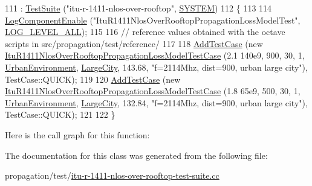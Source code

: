 \begin{DoxyCode}
111   : \hyperlink{classns3_1_1TestSuite_a904b0c40583b744d30908aeb94636d1a}{TestSuite} (\textcolor{stringliteral}{"itu-r-1411-nlos-over-rooftop"}, \hyperlink{classns3_1_1TestSuite_a1ebfcab34ec8161e085e8e3a1855eae0a90c5529a26ab3a5ffcc6e57040dbd82e}{SYSTEM})
112 \{
113 
114   \hyperlink{namespacens3_adc4ef4f00bb2f5f4edae67fc3bc27f20}{LogComponentEnable} (\textcolor{stringliteral}{"ItuR1411NlosOverRooftopPropagationLossModelTest"}, 
      \hyperlink{namespacens3_aa6464a4d69551a9cc968e17a65f39bdba022b1237a4fd1b08d034471df3c58586}{LOG\_LEVEL\_ALL});
115 
116   \textcolor{comment}{// reference values obtained with the octave scripts in src/propagation/test/reference/}
117 
118   \hyperlink{classns3_1_1TestCase_a3718088e3eefd5d6454569d2e0ddd835}{AddTestCase} (\textcolor{keyword}{new} 
      \hyperlink{classItuR1411NlosOverRooftopPropagationLossModelTestCase}{ItuR1411NlosOverRooftopPropagationLossModelTestCase} (2.1
      140e9, 900, 30, 1, \hyperlink{group__propagation_gga0e392ed771a28c92112047e63308a53aad575d1b07ccac0218783bbd0f523784c}{UrbanEnvironment}, \hyperlink{group__propagation_gga29c9a1b1a58b6a56054ff5ea4c5a574da017d6be2af0a102a6147e6519d63f54c}{LargeCity}, 143.68, \textcolor{stringliteral}{"f=2114Mhz, dist=900, urban
       large city"}), TestCase::QUICK);
119 
120   \hyperlink{classns3_1_1TestCase_a3718088e3eefd5d6454569d2e0ddd835}{AddTestCase} (\textcolor{keyword}{new} 
      \hyperlink{classItuR1411NlosOverRooftopPropagationLossModelTestCase}{ItuR1411NlosOverRooftopPropagationLossModelTestCase} (1.8
      65e9, 500, 30, 1, \hyperlink{group__propagation_gga0e392ed771a28c92112047e63308a53aad575d1b07ccac0218783bbd0f523784c}{UrbanEnvironment}, \hyperlink{group__propagation_gga29c9a1b1a58b6a56054ff5ea4c5a574da017d6be2af0a102a6147e6519d63f54c}{LargeCity},  132.84, \textcolor{stringliteral}{"f=2114Mhz, dist=900, urban
       large city"}), TestCase::QUICK);
121 
122 \}
\end{DoxyCode}


Here is the call graph for this function\+:




The documentation for this class was generated from the following file\+:\begin{DoxyCompactItemize}
\item 
propagation/test/\hyperlink{itu-r-1411-nlos-over-rooftop-test-suite_8cc}{itu-\/r-\/1411-\/nlos-\/over-\/rooftop-\/test-\/suite.\+cc}\end{DoxyCompactItemize}
